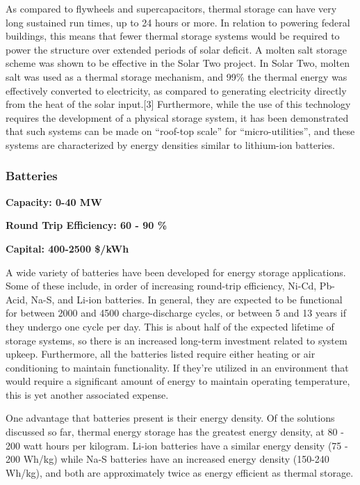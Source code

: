 As compared to flywheels and supercapacitors, thermal storage can have very
long sustained run times, up to 24 hours or more. In relation to powering
federal buildings, this means that fewer thermal storage systems would be
required to power the structure over extended periods of solar deficit. A
molten salt storage scheme was shown to be effective in the Solar Two project.
In Solar Two, molten salt was used as a thermal storage mechanism, and 99\% the
thermal energy was effectively converted to electricity, as compared to
generating electricity directly from the heat of the solar input.[3]
Furthermore, while the use of this technology requires the development of a
physical storage system, it has been demonstrated that such systems can be made
on ``roof-top scale'' for ``micro-utilities'', and these systems are characterized
by energy densities similar to lithium-ion batteries.

\subsubsection{Batteries}
\textbf{Capacity: 0-40 MW}

\noindent\textbf{Round Trip Efficiency: 60 - 90 \%}

\noindent\textbf{Capital: 400-2500 \$/kWh}

A wide variety of batteries have been developed for energy storage
applications. Some of these include, in order of increasing round-trip
efficiency, Ni-Cd, Pb-Acid, Na-S, and Li-ion batteries. In general, they are
expected to be functional for between 2000 and 4500 charge-discharge cycles, or
between 5 and 13 years if they undergo one cycle per day. This is about half of
the expected lifetime of storage systems, so there is an increased long-term
investment related to system upkeep. Furthermore, all the batteries listed
require either heating or air conditioning to maintain functionality. If
they're utilized in an environment that would require a significant amount of
energy to maintain operating temperature, this is yet another associated expense.

One advantage that batteries present is their energy density. Of the solutions
discussed so far, thermal energy storage has the greatest energy density, at 80
- 200 watt hours per kilogram. Li-ion batteries have a similar energy density
(75 - 200 Wh/kg) while Na-S batteries have an increased energy density (150-240
Wh/kg), and both are approximately twice as energy efficient as thermal
storage.

